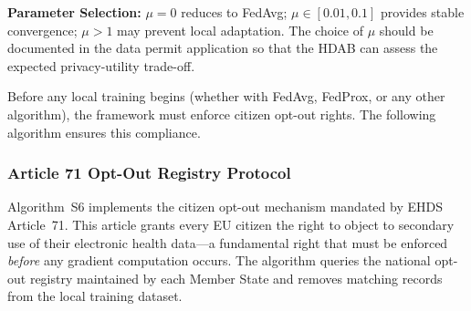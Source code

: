 \documentclass[conference]{IEEEtran}
\begin{document}
\begin{figure}[htbp]
\centering
{}
\end{figure}

\textbf{Parameter Selection:} $\mu = 0$ reduces to FedAvg; $\mu \in [0.01, 0.1]$ provides stable convergence; $\mu > 1$ may prevent local adaptation. The choice of $\mu$ should be documented in the data permit application so that the HDAB can assess the expected privacy-utility trade-off.

Before any local training begins (whether with FedAvg, FedProx, or any other algorithm), the framework must enforce citizen opt-out rights. The following algorithm ensures this compliance.

\subsubsection{Article 71 Opt-Out Registry Protocol}

Algorithm~S6 implements the citizen opt-out mechanism mandated by EHDS Article~71. This article grants every EU citizen the right to object to secondary use of their electronic health data---a fundamental right that must be enforced \textit{before} any gradient computation occurs. The algorithm queries the national opt-out registry maintained by each Member State and removes matching records from the local training dataset.
\end{document}
